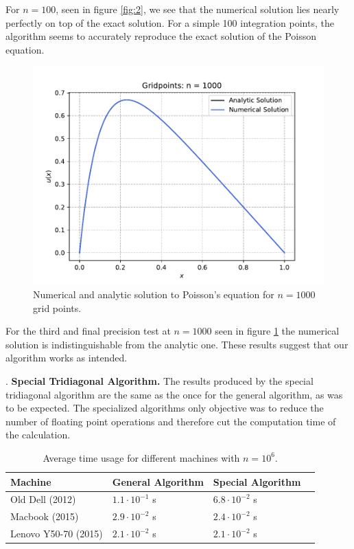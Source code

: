 \documentclass[a4paper,10pt]{article}
\begin{document}
For $n = 100$, seen in figure \ref{fig:2}, we see that the numerical solution lies nearly perfectly on top of the exact solution. For a simple 100 integration points, the algorithm seems to accurately reproduce the exact solution of the Poisson equation.


\begin{figure}[h]
  \centering
  \includegraphics[width=0.9\linewidth]{figures/fig_1000_b.pdf}
  \caption{Numerical and analytic solution to Poisson's equation for $n = 1000$ grid points.}
  \label{fig:3}
\end{figure}

For the third and final precision test at $n = 1000$ seen in figure \ref{fig:3} the numerical solution is indistinguishable from the analytic one. These results suggest that our algorithm works as intended.

\bigskip

. \textbf{Special Tridiagonal Algorithm.}
The results produced by the special tridiagonal algorithm are the same as the once for the general algorithm, as was to be expected. The specialized algorithms only objective was to reduce the number of floating point operations and therefore cut the computation time of the calculation. \\

\begin{table}[]
\begin{tabular}{llll}
\hline
\hline
Machine &General Algorithm  & Special Algorithm \\
\hline
Old Dell (2012)& $1.1\cdot 10^{-1}$ s & $6.8\cdot 10^{-2}$ s\\
Macbook (2015) & $2.9\cdot 10^{-2}$ s & $2.4\cdot 10^{-2}$ s\\
Lenovo Y50-70 (2015) & $2.1\cdot 10^{-2}$ s & $2.1\cdot 10^{-2}$ s
\end{tabular}
\caption{Average time usage for different machines with $n = 10^6$.}
\label{tab:timeres}
\end{table}
\end{document}
